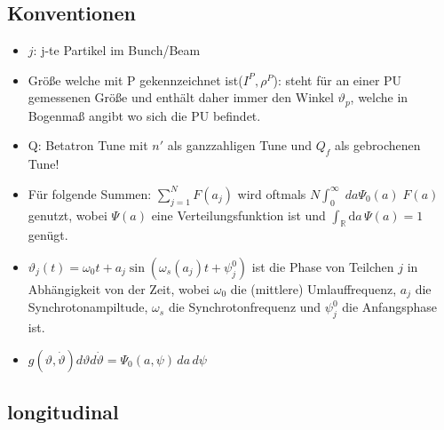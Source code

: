 \documentclass[12pt]{article}%
\renewcommand{\theta}{\vartheta}
\begin{document}
\subsection{Konventionen}
\begin{itemize}
	\item $j$: j-te Partikel im Bunch/Beam
	\item Größe welche mit P gekennzeichnet ist($I^P,\rho^P$): steht für an einer PU gemessenen Größe und enthält daher immer den Winkel $\theta_p$, welche in Bogenmaß angibt wo sich die PU befindet.
	
	\item Q: Betatron Tune mit $n'$ als ganzzahligen Tune und $Q_f$ als gebrochenen Tune! 
		
	\item Für folgende Summen: $\sum_{j=1}^{N}F(a_j)$ wird oftmals $N\int_{0}^{\infty}\; da \Psi_0(a) \; F(a)$ genutzt, wobei $\Psi(a)$ eine Verteilungsfunktion ist und $\int_{\mathbb{R}} \mathrm{d}a \, \Psi(a) = 1$ genügt.
	
	\item $\theta_j(t) = \omega_0 t + a_j \sin( \omega_s(a_j)t + \psi_j^0)$ ist die Phase von Teilchen $j$ in Abhängigkeit von der Zeit, wobei $\omega_0$ die (mittlere) Umlauffrequenz, $a_j$ die Synchrotonampiltude, $\omega_s$ die Synchrotonfrequenz und $\psi_j^0$ die Anfangsphase ist.
	
	\item $g(\theta,\dot{\theta})d\theta d\dot{\theta}=\Psi_0(a,\psi)\,da \,d\psi$
	
\end{itemize}

\subsection{longitudinal} 
\end{document}
